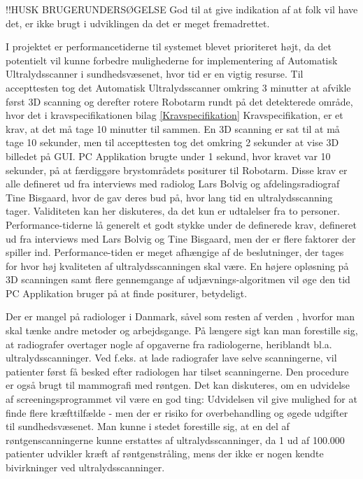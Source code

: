 !!HUSK BRUGERUNDERSØGELSE
God til at give indikation af at folk vil have det, er ikke brugt i udviklingen da det er meget fremadrettet.

I projektet er performancetiderne til systemet blevet prioriteret højt, da det potentielt vil kunne forbedre mulighederne for implementering af Automatisk Ultralydsscanner i sundhedsvæsenet, hvor tid er en vigtig resurse. Til accepttesten tog det Automatisk Ultralydsscanner omkring 3 minutter at afvikle først 3D scanning og derefter rotere Robotarm rundt på det detekterede område, hvor det i kravspecifikationen bilag \ref{Kravspecifikation} Kravspecifikation, er et krav, at det må tage 10 minutter til sammen. En 3D scanning er sat til at må tage 10 sekunder, men til accepttesten tog det omkring 2 sekunder at vise 3D billedet på GUI. PC Applikation brugte under 1 sekund, hvor kravet var 10 sekunder, på at færdiggøre brystområdets positurer til Robotarm. Disse krav er alle defineret ud fra interviews med radiolog Lars Bolvig og afdelingsradiograf Tine Bisgaard, hvor de gav deres bud på, hvor lang tid en ultralydsscanning tager. Validiteten kan her diskuteres, da det kun er udtalelser fra to personer.
Performance-tiderne lå generelt et godt stykke under de definerede krav, defineret ud fra interviews med Lars Bolvig og  Tine Bisgaard, men der er flere faktorer der spiller ind. Performance-tiden er meget afhængige af de beslutninger, der tages for hvor høj kvaliteten af ultralydsscanningen skal være. En højere opløsning på 3D scanningen samt flere gennemgange af udjævnings-algoritmen vil øge den tid PC Applikation bruger på at finde positurer, betydeligt.  

Der er mangel på radiologer i Danmark, såvel som resten af verden \cite{Lagemangel}, hvorfor man skal tænke andre metoder og arbejdsgange. På længere sigt kan man forestille sig, at radiografer overtager nogle af opgaverne fra radiologerne, heriblandt bl.a. ultralydsscanninger. Ved f.eks. at lade radiografer lave selve scanningerne, vil patienter først få besked efter radiologen har tilset scanningerne. Den procedure er også brugt til mammografi med røntgen. Det kan diskuteres, om en udvidelse af screeningsprogrammet vil være en god ting: Udvidelsen vil give mulighed for at finde flere kræfttilfælde - men der er risiko for overbehandling og øgede udgifter til sundhedsvæsenet. Man kunne i stedet forestille sig, at en del af røntgenscanningerne kunne erstattes af ultralydsscanninger, da 1 ud af 100.000 \cite{Risk} patienter udvikler kræft af røntgenstråling, mens der ikke er nogen kendte bivirkninger ved ultralydsscanninger.

